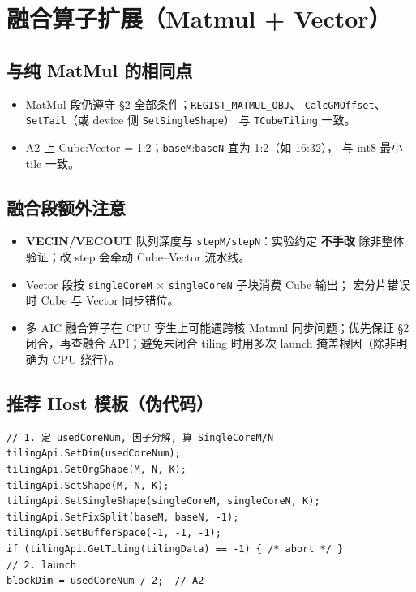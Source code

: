 \documentclass[UTF8,a4paper,11pt]{ctexart}
\begin{document}
\section{融合算子扩展（Matmul + Vector）}

\subsection{与纯 MatMul 的相同点}
\begin{itemize}
  \item MatMul 段仍遵守 §2 全部条件；\texttt{REGIST\_MATMUL\_OBJ}、
        \texttt{CalcGMOffset}、\texttt{SetTail}（或 device 侧 \texttt{SetSingleShape}）
        与 \texttt{TCubeTiling} 一致。
  \item A2 上 Cube:Vector = 1:2；\texttt{baseM}:\texttt{baseN} 宜为 1:2（如 16:32），
        与 int8 最小 tile 一致。
\end{itemize}

\subsection{融合段额外注意}
\begin{itemize}
  \item \textbf{VECIN/VECOUT} 队列深度与 \texttt{stepM/stepN}：实验约定 \textbf{不手改}
        除非整体验证；改 step 会牵动 Cube--Vector 流水线。
  \item Vector 段按 \texttt{singleCoreM} $\times$ \texttt{singleCoreN} 子块消费 Cube 输出；
        宏分片错误时 Cube 与 Vector 同步错位。
  \item 多 AIC 融合算子在 CPU 孪生上可能遇跨核 Matmul 同步问题；优先保证
        §2 闭合，再查融合 API；避免未闭合 tiling 时用多次 launch 掩盖根因（除非明确为 CPU 绕行）。
\end{itemize}

\subsection{推荐 Host 模板（伪代码）}
\begin{lstlisting}
// 1. 定 usedCoreNum, 因子分解, 算 SingleCoreM/N
tilingApi.SetDim(usedCoreNum);
tilingApi.SetOrgShape(M, N, K);
tilingApi.SetShape(M, N, K);
tilingApi.SetSingleShape(singleCoreM, singleCoreN, K);
tilingApi.SetFixSplit(baseM, baseN, -1);
tilingApi.SetBufferSpace(-1, -1, -1);
if (tilingApi.GetTiling(tilingData) == -1) { /* abort */ }
// 2. launch
blockDim = usedCoreNum / 2;  // A2
\end{lstlisting}
\end{document}
